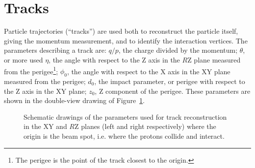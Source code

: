 
\section{Tracks}\label{sec:tracks}

Particle trajectories (``tracks'') are used both to reconstruct the particle itself, giving the 
momentum measurement, and to identify the interaction vertices.
The parameters describing a track are: $q/p$, the charge divided by the momentum; $\theta$, or more used $\eta$, the angle
with respect to the Z axis in the $R$Z plane measured from the 
perigee\footnote{The perigee is the point of the track closest to the origin.}; $\phi_0$, the angle 
with respect to the X axis in the XY plane measured from the perigee; $d_0$, the impact parameter, 
or perigee with respect to the Z axis in the XY plane; $z_0$, Z component of the perigee.
These parameters are shown in the double-view drawing of Figure~\ref{fig:trackpar}.

\begin{figure}[tb]\begin{center}
	\caption[bla]{Schematic drawings of the parameters used for track reconstruction in the XY and $R$Z planes (left and right respectively)
          where the origin is the beam spot, i.e. where the protons collide and interact.
\label{fig:trackpar}}
\end{center}\end{figure}

